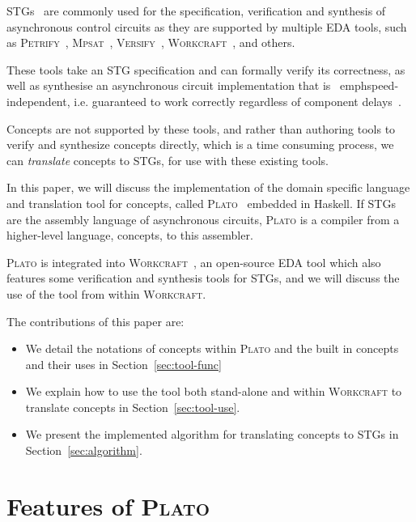 \documentclass[british,conference,compsoc]{IEEEtran}
\newcommand{\noun}[1]{\textsc{#1}}
\begin{document}
STGs~\cite{Chu_1987_phd}\cite{Rosenblum_1985_tpn} are commonly used for the 
specification, verification and synthesis of asynchronous control circuits as 
they are supported by multiple EDA tools, such as 
\noun{Petrify}~\cite{Cortadella}, \noun{Mpsat}~\cite{khomenko2004detecting}, 
\noun{Versify}~\cite{i1997formal}, 
\noun{Workcraft}~\cite{2007_poliakov_workcraft}\cite{Workcraft_website}, 
and others.

These tools take an STG specification and can formally verify its correctness, 
as well as synthesise an asynchronous circuit implementation that is \
emph{speed-independent}, i.e. guaranteed to work correctly regardless of 
component delays~\cite{Muller_1959_ts}.

Concepts are not supported by these tools, and rather than
authoring tools to verify and synthesize concepts directly, which is a time 
consuming process, we can \emph{translate} concepts to STGs, for use with these
existing tools.

In this paper, we will discuss the implementation of the domain specific 
language and translation tool for concepts, called 
\noun{Plato}~\cite{2016_concepts_github} embedded in Haskell. 
If STGs are the assembly language of asynchronous circuits, \noun{Plato} is a 
compiler from a higher-level language, concepts, to this assembler. 

\noun{Plato} is 
integrated into \noun{Workcraft}~\cite{Workcraft_website}, an open-source 
EDA tool which also features some verification and synthesis tools for STGs, 
and we will discuss the use of the tool from within \noun{Workcraft}.

The contributions of this paper are:
\vspace{-1mm}
\begin{itemize}
  \item We detail the notations of concepts within \noun{Plato} and the built in
  concepts and their uses in Section~\ref{sec:tool-func}
  \item We explain how to use the tool both stand-alone and within
  \noun{Workcraft} to translate concepts in Section~\ref{sec:tool-use}.
  \item We present the implemented algorithm for translating concepts to STGs
  in Section~\ref{sec:algorithm}.
\end{itemize}

\section{Features of \noun{Plato}\label{sec:tool-func}}
\end{document}
